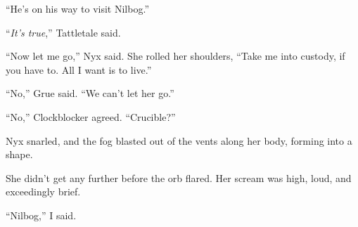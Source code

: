 ``He's on his way to visit Nilbog.''



``\emph{It's true},'' Tattletale said.



``Now let me go,'' Nyx said.  She rolled her shoulders, ``Take me into custody, if you have to.  All I want is to live.''



``No,'' Grue said.  ``We can't let her go.''



``No,'' Clockblocker agreed.  ``Crucible?''



Nyx snarled, and the fog blasted out of the vents along her body, forming into a shape.



She didn't get any further before the orb flared.  Her scream was high, loud, and exceedingly brief.



``Nilbog,'' I said.





